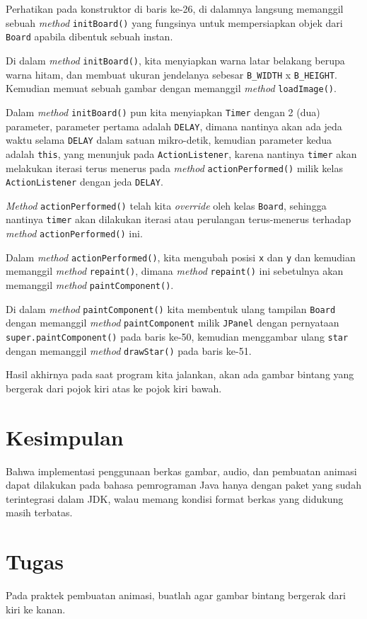 Perhatikan pada konstruktor di baris ke-26, di dalamnya langsung memanggil sebuah \textit{method} \texttt{initBoard()} yang fungsinya untuk mempersiapkan objek dari \texttt{Board} apabila dibentuk sebuah instan.

Di dalam \textit{method} \texttt{initBoard()}, kita menyiapkan warna latar belakang berupa warna hitam, dan membuat ukuran jendelanya sebesar \texttt{B\_WIDTH} x \texttt{B\_HEIGHT}. Kemudian memuat sebuah gambar dengan memanggil \textit{method} \texttt{loadImage()}.

Dalam \textit{method} \texttt{initBoard()} pun kita menyiapkan \texttt{Timer} dengan 2 (dua) parameter, parameter pertama adalah \texttt{DELAY}, dimana nantinya akan ada jeda waktu selama \texttt{DELAY} dalam satuan mikro-detik, kemudian parameter kedua adalah \texttt{this}, yang menunjuk pada \texttt{ActionListener}, karena nantinya \texttt{timer} akan melakukan iterasi terus menerus pada \textit{method} \texttt{actionPerformed()} milik kelas \texttt{ActionListener} dengan jeda \texttt{DELAY}.

\textit{Method} \texttt{actionPerformed()} telah kita \textit{override} oleh kelas \texttt{Board}, sehingga nantinya \texttt{timer} akan dilakukan iterasi atau perulangan terus-menerus terhadap \textit{method} \texttt{actionPerformed()} ini.

Dalam \textit{method} \texttt{actionPerformed()}, kita mengubah posisi \texttt{x} dan \texttt{y} dan kemudian memanggil \textit{method} \texttt{repaint()}, dimana \textit{method} \texttt{repaint()} ini sebetulnya akan memanggil \textit{method} \texttt{paintComponent()}. 

Di dalam \textit{method} \texttt{paintComponent()} kita membentuk ulang tampilan \texttt{Board} dengan memanggil \textit{method} \texttt{paintComponent} milik \texttt{JPanel} dengan pernyataan \texttt{super.paintComponent()} pada baris ke-50, kemudian menggambar ulang \texttt{star} dengan memanggil \textit{method} \texttt{drawStar()} pada baris ke-51.

Hasil akhirnya pada saat program kita jalankan, akan ada gambar bintang yang bergerak dari pojok kiri atas ke pojok kiri bawah.

\section{Kesimpulan}

Bahwa implementasi penggunaan berkas gambar, audio, dan pembuatan animasi dapat dilakukan pada bahasa pemrograman Java hanya dengan paket yang sudah terintegrasi dalam JDK, walau memang kondisi format berkas yang didukung masih terbatas.

\section{Tugas}

Pada praktek pembuatan animasi, buatlah agar gambar bintang bergerak dari kiri ke kanan.
